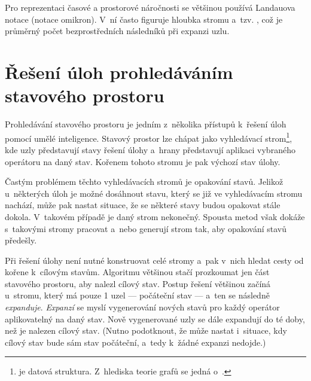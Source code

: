 Pro reprezentaci časové a prostorové náročnosti se většinou používá Landauova notace (notace omikron). V~ní často figuruje hloubka stromu a~tzv. , což je průměrný počet bezprostředních následníků při expanzi uzlu.



\section{Řešení úloh prohledáváním stavového prostoru}

Prohledávání stavového prostoru je jedním z~několika přístupů k~řešení úloh pomocí umělé inteligence. Stavový prostor lze chápat jako vyhledávací strom\footnote{ je datová struktura. Z~hlediska teorie grafů se jedná o~.}, kde uzly představují stavy řešení úlohy a~hrany představují aplikaci vybraného operátoru na daný stav. Kořenem tohoto stromu je pak výchozí stav úlohy.

Častým problémem těchto vyhledávacích stromů je opakování stavů. Jelikož u~některých úloh je možné dosáhnout stavu, který se již ve vyhledávacím stromu nachází, může pak nastat situace, že se některé stavy budou opakovat stále dokola. V~takovém případě je daný strom nekonečný. Spousta metod však dokáže s~takovými stromy pracovat a~nebo generují strom tak, aby opakování stavů předešly.

Při řešení úlohy není nutné konstruovat celé stromy a~pak v~nich hledat cesty od kořene k~cílovým stavům. Algoritmu většinou stačí prozkoumat jen část stavového prostoru, aby nalezl cílový stav. Postup řešení většinou začíná u~stromu, který má pouze 1 uzel --- počáteční stav --- a~ten se následně \emph{expanduje}. \emph{Expanzí} se myslí vygenerování nových stavů pro každý operátor aplikovatelný na daný stav. Nově vygenerované uzly se dále expandují do té doby, než je nalezen cílový stav. (Nutno podotknout, že může nastat i~situace, kdy cílový stav bude sám stav počáteční, a~tedy k~žádné expanzi nedojde.)

